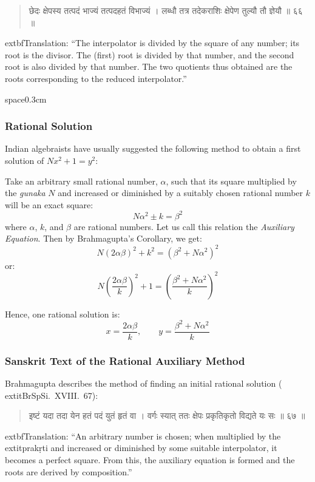 \documentclass[11pt,a4paper]{article}
\newcommand{\dev}[1]{{\devanagarifont #1}}
\newenvironment{sanskritverse}{%
  \begin{quote}
  \devanagarifont
  \small
  \color{titlecolor}
}{\end{quote}}
\theoremstyle{definition}
\begin{document}
\begin{sanskritverse}
\dev{छेदः क्षेपस्य तत्पदं भाज्यं तत्पदहतं विभाज्यं ।}
\dev{लब्धौ तत्र तदेकराशिः क्षेपेण तुल्यौ तौ ज्ञेयौ ॥ ६६ ॥}
\end{sanskritverse}

	extbf{Translation:} ``The interpolator is divided by the square of any number; its root is the divisor. The (first) root is divided by that number, and the second root is also divided by that number. The two quotients thus obtained are the roots corresponding to the reduced interpolator.''

space{0.3cm}

\subsubsection{Rational Solution}

Indian algebraists have usually suggested the following method to obtain a first solution of $Nx^2 + 1 = y^2$:

Take an arbitrary small rational number, $\alpha$, such that its square multiplied by the \textit{gunaka} $N$ and increased or diminished by a suitably chosen rational number $k$ will be an exact square:
\[
N\alpha^2 \pm k = \beta^2
\]
where $\alpha$, $k$, and $\beta$ are rational numbers. Let us call this relation the \textit{Auxiliary Equation}. Then by Brahmagupta's Corollary, we get:
\[
N(2\alpha\beta)^2 + k^2 = (\beta^2 + N\alpha^2)^2
\]
or:
\[
N\left(\frac{2\alpha\beta}{k}\right)^2 + 1 = \left(\frac{\beta^2 + N\alpha^2}{k}\right)^2
\]

Hence, one rational solution is:
\[
x = \frac{2\alpha\beta}{k}, \qquad y = \frac{\beta^2 + N\alpha^2}{k}
\]

\subsubsection{Sanskrit Text of the Rational Auxiliary Method}

Brahmagupta describes the method of finding an initial rational solution (	extit{BrSpSi}.\ XVIII.\ 67):

\begin{sanskritverse}
\dev{इष्टं यदा तदा येन हतं पदं युतं हृतं वा ।}
\dev{वर्गः स्यात् ततः क्षेपः प्रकृतिकृतो विद्यते यः सः ॥ ६७ ॥}
\end{sanskritverse}

	extbf{Translation:} ``An arbitrary number is chosen; when multiplied by the 	extit{prak\d{r}ti} and increased or diminished by some suitable interpolator, it becomes a perfect square. From this, the auxiliary equation is formed and the roots are derived by composition.''
\end{document}

